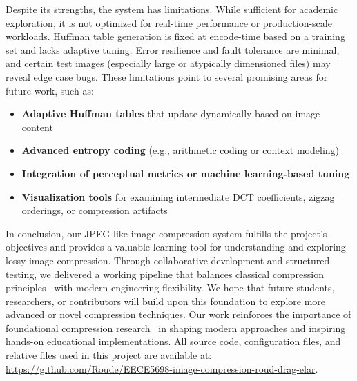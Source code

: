 Despite its strengths, the system has limitations. While sufficient for academic exploration, it is not optimized for real-time performance or production-scale workloads. Huffman table generation is fixed at encode-time based on a training set and lacks adaptive tuning. Error resilience and fault tolerance are minimal, and certain test images (especially large or atypically dimensioned files) may reveal edge case bugs. These limitations point to several promising areas for future work, such as:

\begin{itemize}
    \item \textbf{Adaptive Huffman tables} that update dynamically based on image content
    \item \textbf{Advanced entropy coding} (e.g., arithmetic coding or context modeling)
    \item \textbf{Integration of perceptual metrics or machine learning-based tuning}
    \item \textbf{Visualization tools} for examining intermediate DCT coefficients, zigzag orderings, or compression artifacts
\end{itemize}

In conclusion, our JPEG-like image compression system fulfills the project’s objectives and provides a valuable learning tool for understanding and exploring lossy image compression. Through collaborative development and structured testing, we delivered a working pipeline that balances classical compression principles~\cite{jpegOverview2025} with modern engineering flexibility. We hope that future students, researchers, or contributors will build upon this foundation to explore more advanced or novel compression techniques. Our work reinforces the importance of foundational compression research~\cite{haines1992compression} in shaping modern approaches and inspiring hands-on educational implementations.
All source code, configuration files, and relative files used in this project are available at: \url{https://github.com/Roude/EECE5698-image-compression-roud-drag-elar}.
